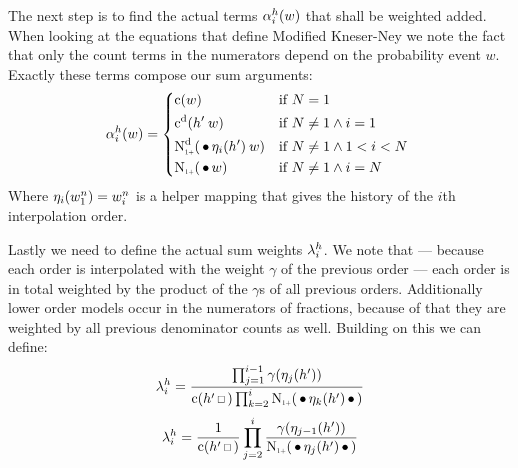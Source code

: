 The next step is to find the actual terms $\alpha_i^h(w)$ that shall be
weighted added.
When looking at the equations that define Modified Kneser-Ney we note the fact
that only the count terms in the numerators depend on the probability event $w$.
Exactly these terms compose our sum arguments:
\begin{equation}
  \SumArg_i^h(w) =
    \begin{dcases*}
      \Count(w)                                              & if $N = 1$ \\
      \DiscountedCount(\SeenHistory \: w)                    & if $N \neq 1 \land i = 1$ \\
      \DiscountedCount*(\WSkp \History_i(\SeenHistory) \: w) & if $N \neq 1 \land 1 < i < N$ \\
      \ContCountIp(\WSkp w)                                  & if $N \neq 1 \land i = N$
    \end{dcases*}
\end{equation}
Where $\eta_i(w_1^n) = w_i^n$ is a helper mapping that gives the history
of the $i$th interpolation order.

Lastly we need to define the actual sum weights $\lambda_i^h$.
We note that --- because each order is interpolated with the weight $\gamma$ of
the previous order --- each order is in total weighted by the product of the
$\gamma$s of all previous orders.
Additionally lower order models occur in the numerators of fractions, because of
that they are weighted by all previous denominator counts as well.
Building on this we can define:
\begin{equation}
  \label{eq:mkn-sumweight}
  \SumWeight_i^h = \frac{\prod_{j = 1}^{i - 1} \gamma(\History_j(\SeenHistory))}
                        {\Count(\SeenHistory \Skp) \prod_{k = 2}^{i} \ContCountIp(\WSkp \History_k(\SeenHistory) \WSkp)}
\end{equation}
\begin{equation}
  \SumWeight_i^h = \frac{1}{\Count(\SeenHistory \Skp)} \prod_{j = 2}^i \frac{\gamma(\History_{j-1}(\SeenHistory))}{\ContCountIp(\WSkp \History_j(\SeenHistory) \WSkp)}
\end{equation}

